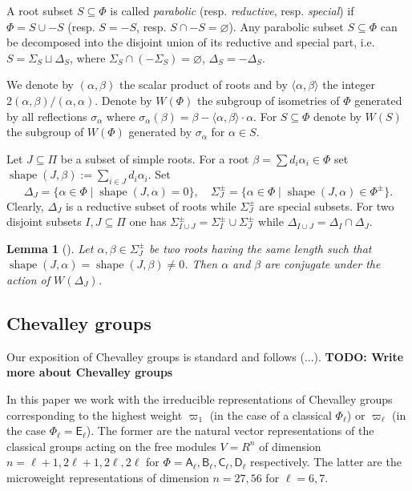 \documentclass[12pt]{amsart}
\numberwithin{equation}{section}
\newtheorem{lemma}[lemmacounter]{Lemma}
\theoremstyle{definition}
\DeclareMathOperator{\shape}{shape}
\newcommand{\rA}{\mathsf{A}}
\newcommand{\rB}{\mathsf{B}}
\newcommand{\rC}{\mathsf{C}}
\newcommand{\rD}{\mathsf{D}}
\newcommand{\rE}{\mathsf{E}}
\begin{document}
A root subset $S\subseteq \Phi$ is called {\it parabolic} (resp. {\it reductive}, resp. {\it special}) if $\Phi=S \cup -S$ (resp. $S = -S$, resp. $S \cap -S=\varnothing$).
Any parabolic subset $S \subseteq \Phi$ can be decomposed into the disjoint union of its reductive and special part, i.e. 
$S = \Sigma_S \sqcup \Delta_S$, where $\Sigma_S \cap (-\Sigma_S) = \varnothing$, $\Delta_S = -\Delta_S$.

We denote by $(\alpha, \beta)$ the scalar product of roots and by $\langle \alpha, \beta\rangle$ the integer $2(\alpha, \beta)/(\alpha, \alpha)$.
Denote by $W(\Phi)$ the subgroup of isometries of $\Phi$ generated by all reflections $\sigma_\alpha$ where $\sigma_\alpha(\beta)=\beta-\langle\alpha,\beta \rangle\cdot \alpha$.
For $S\subseteq \Phi$ denote by $W(S)$ the subgroup of $W(\Phi)$ generated by $\sigma_\alpha$ for $\alpha\in S$.

Let $J\subseteq \Pi$ be a subset of simple roots. 
For a root $\beta = \sum d_i\alpha_i \in \Phi$ set $\shape(J, \beta):=\sum\limits_{i\in J}d_i \alpha_i$.
Set $$\Delta_J = \{\alpha \in \Phi \mid \shape(J, \alpha)=0\},\quad \Sigma^\pm_J = \{\alpha \in \Phi \mid \shape(J, \alpha)\in\Phi^\pm \}.$$
Clearly, $\Delta_J$ is a reductive subset of roots while $\Sigma^\pm_J$ are special subsets.
For two disjoint subsets $I, J\subseteq \Pi$ one has $\Sigma^\pm_{I \cup J} = \Sigma^\pm_I\cup\Sigma^\pm_J$ while $\Delta_{I\cup J} = \Delta_I \cap \Delta_J$.

\begin{lemma}[{\cite[Lemma~1]{ABS}}]\label{lemma:abs}
Let $\alpha, \beta \in \Sigma^\pm_J$ be two roots having the same length such that $\shape(J,\alpha)=\shape(J,\beta)\neq 0$.
Then $\alpha$ and $\beta$ are conjugate under the action of $W(\Delta_J)$.
\end{lemma}

\subsection{Chevalley groups}
Our exposition of Chevalley groups is standard and follows (...).
\textbf{TODO: Write more about Chevalley groups}

In this paper we work with the irreducible representations of Chevalley groups corresponding to the highest weight
$\varpi_1$ (in the case of a classical $\Phi_\ell$) or $\varpi_\ell$ (in the case $\Phi_\ell=\rE_\ell$). 
The former are the natural vector representations of the classical groups acting on the free modules $V=R^n$ of dimension 
$n=\ell+1, 2\ell+1, 2\ell,2\ell$ for $\Phi=\rA_\ell,\rB_\ell,\rC_\ell,\rD_\ell$ respectively.
The latter are the microweight representations of dimension $n=27, 56$ for $\ell=6,7$.
\end{document}
